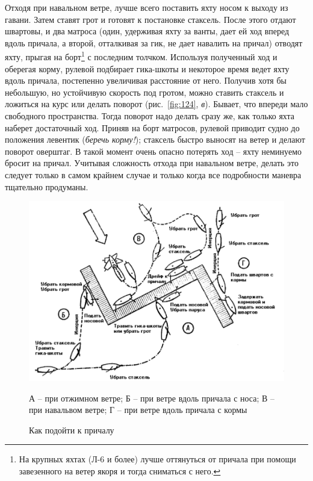 \documentclass[a4paper, 12pt, twoside, final]{scrbook}
\begin{document}
Отходя при навальном ветре, лучше всего поставить яхту носом к выходу из гавани. Затем ставят грот и готовят к постановке стаксель. После этого отдают швартовы, и два матроса (один, удерживая яхту за ванты, дает ей ход вперед вдоль причала, а второй, отталкивая за гик, не дает навалить на причал) отводят яхту, прыгая на борт\footnote{На крупных яхтах (Л-6 и более) лучше оттянуться от причала при помощи завезенного на ветер якоря и тогда сниматься с него.} с последним толчком. Используя полученный ход и оберегая корму, рулевой подбирает гика-шкоты и некоторое время ведет яхту вдоль причала, постепенно увеличивая расстояние от него. Получив хотя бы небольшую, но устойчивую скорость под гротом, можно ставить стаксель и ложиться на курс или делать поворот (рис.~\ref{fig:124}, \textit{в}). Бывает, что впереди мало свободного пространства. Тогда поворот надо делать сразу же, как только яхта наберет достаточный ход. Приняв на борт матросов, рулевой приводит судно до положения левентик (\textit{беречь корму!}); стаксель быстро выносят на ветер и делают поворот оверштаг. В такой момент очень опасно потерять ход \--- яхту неминуемо бросит на причал. Учитывая сложность отхода при навальном ветре, делать это следует только в самом крайнем случае и только когда все подробности маневра тщательно продуманы.


\begin{figure}[htbp]
   \centering
   \includegraphics{pics/125_Kak_podojti} %
   \caption{Как подойти к причалу}
   \label{fig:125}
   \centering\small
   А \--- при отжимном ветре; Б \--- при ветре вдоль причала с носа; В \--- при навальвом ветре; Г \--- при ветре  вдоль причала с кормы
\end{figure}
\end{document}
